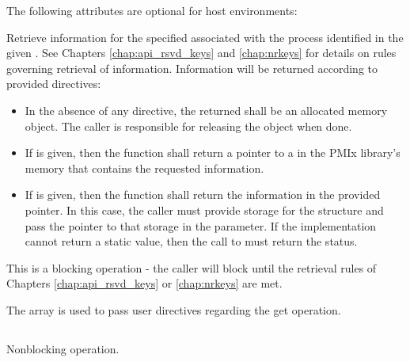 \reqattrend

\optattrstart
The following attributes are optional for host environments:


\optattrend

\descr

Retrieve information for the specified  associated with the process identified in the given . See Chapters \ref{chap:api_rsvd_keys} and \ref{chap:nrkeys} for details on rules governing retrieval of information. Information will be returned according to provided directives:

\begin{itemize}
    \item In the absence of any directive, the returned  shall be an allocated memory object. The caller is responsible for releasing the object when done.
    \item If  is given, then the function shall return a pointer to a  in the \ac{PMIx} library's memory that contains the requested information.
    \item If  is given, then the function shall return the information in the provided  pointer. In this case, the caller must provide storage for the structure and pass the pointer to that storage in the  parameter. If the implementation cannot return a static value, then the call to  must return the  status.
\end{itemize}

This is a blocking operation - the caller will block until the retrieval rules of Chapters \ref{chap:api_rsvd_keys} or \ref{chap:nrkeys} are met.

The  array is used to pass user directives regarding the get operation.

\subsection{}

\summary

Nonblocking  operation.

\format


